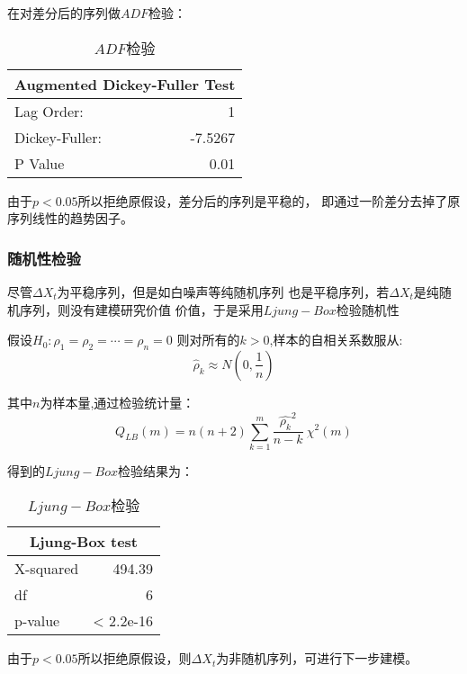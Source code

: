 \documentclass[12pt,a4paper]{nmmcm}
\begin{document}
在对差分后的序列做\(ADF\)检验：
\begin{table}[H]
  \centering
  \caption{\(ADF\)检验}
    \begin{tabular}{l|r}
    \multicolumn{2}{c}{ Augmented Dickey-Fuller Test} \\
    \hline
    Lag Order: & 1 \\
    Dickey-Fuller: & -7.5267\\
    P Value  & 0.01 \\
    \end{tabular}%
  \label{tab:ADF_diff}%
\end{table}%

由于\(p<0.05\)所以拒绝原假设，差分后的序列是平稳的，
即通过一阶差分去掉了原序列线性的趋势因子。

\subsubsection*{随机性检验}
尽管\(\Delta X_t\)为平稳序列，但是如白噪声等纯随机序列
也是平稳序列，若\(\Delta X_t\)是纯随机序列，则没有建模研究价值
价值，于是采用\(Ljung-Box\)检验随机性

假设\(H_0:\rho _1 = \rho _2 = \cdots = \rho _n = 0\)
则对所有的\(k>0\),样本的自相关系数服从:
\begin{equation}
  \hat{\rho}_k \approx N(0,\frac{1}{n})
\end{equation}

其中\(n\)为样本量,通过检验统计量：
\begin{equation}
  Q_{LB}(m) = n (n+2)\sum_{k=1}^{m}{\frac{\hat{\rho_{k}}^2}{n-k}} ~\chi^2(m)
\end{equation}

得到的\(Ljung-Box\)检验结果为：
\begin{table}[H]
  \centering
  \caption{\(Ljung-Box\)检验}
    \begin{tabular}{l|r}
    \multicolumn{2}{c}{Ljung-Box test} \\
    \hline
    X-squared  & \multicolumn{1}{r}{494.39} \\
    df    & \multicolumn{1}{r}{6} \\
    p-value & < 2.2e-16 \\
    \end{tabular}%
  \label{tab:Ljung-Box}%
\end{table}%

由于\(p<0.05\)所以拒绝原假设，则\(\Delta X_t\)为非随机序列，可进行下一步建模。
\end{document}
